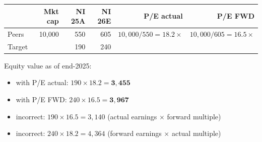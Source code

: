 \begin{exbox}
\begin{center}
\small
\begin{tabular}{@{}lrrrrr@{}}
\toprule
& Mkt cap & NI 25A & NI 26E & P/E actual & P/E FWD\\
\midrule
Peers & 10,000 & 550 & 605 & $10{,}000/550=18.2\times$ & $10{,}000/605=16.5\times$\\
Target & & 190 & 240 & & \\
\bottomrule
\end{tabular}
\end{center}
Equity value as of end-2025:
\begin{itemize}[leftmargin=*]
  \item with P/E actual: $190\times18.2=\mathbf{3{,}455}$ \checkmark
  \item with P/E FWD: $240\times16.5=\mathbf{3{,}967}$ \checkmark
  \item \textcolor{keyred}{incorrect}: $190\times16.5=3{,}140$ (actual earnings $\times$ forward multiple)
  \item \textcolor{keyred}{incorrect}: $240\times18.2=4{,}364$ (forward earnings $\times$ actual multiple)
\end{itemize}
\end{exbox}

